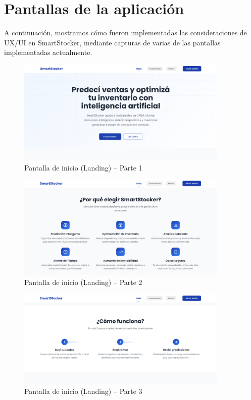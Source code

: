 \section{Pantallas de la aplicación}

A continuación, mostramos cómo fueron implementadas las consideraciones de UX/UI en SmartStocker, mediante capturas de varias de las pantallas implementadas actualmente.

\begin{figure}[htbp]
    \centering
    \includegraphics[width=0.9\textwidth]{images/landing1.png}
    \caption{Pantalla de inicio (Landing) – Parte 1}
    \label{fig:ux-landing1}
\end{figure}

\begin{figure}[htbp]
    \centering
    \includegraphics[width=0.9\textwidth]{images/landing2.png}
    \caption{Pantalla de inicio (Landing) – Parte 2}
    \label{fig:ux-landing2}
\end{figure}

\begin{figure}[htbp]
    \centering
    \includegraphics[width=0.9\textwidth]{images/landing3.png}
    \caption{Pantalla de inicio (Landing) – Parte 3}
    \label{fig:ux-landing3}
\end{figure}

